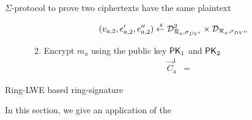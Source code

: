 \begin{section}{$\Sigma$-protocol to prove two ciphertexts have the same plaintext}
\begin{description}
\begin{enumerate}
\begin{align*}
          (v_{a,2}, e_{a,2}', e_{a,2}'') &\stackrel{{\scriptscriptstyle \mkern4mu \$}}{\gets} \mathcal{D}_{{\mathcal{R}}_q, \sigma_{DV'}}^2 \times \mathcal{D}_{{\mathcal{R}}_q, \sigma_{DV''}}
        \end{align*}
        \item Encrypt $m_a$ using the public key $\mathsf{PK}_1$ and $\mathsf{PK}_2$
        \begin{align*}
          \vec{C}_{a}^{1} &=
        \end{align*}
      \end{enumerate}
  \end{description}
\end{section}

\begin{section}{Ring-LWE based ring-signature}

  In this section, we give an application of the


\end{section}
